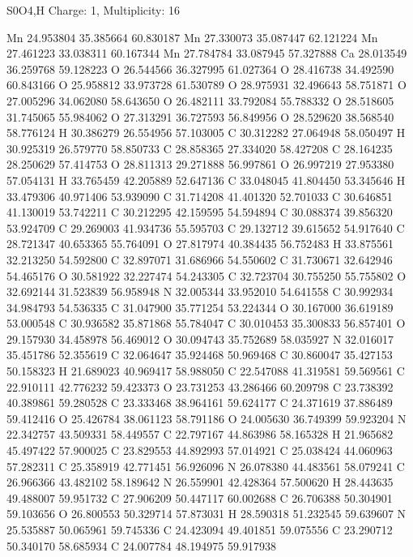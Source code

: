 \documentclass{article}
\begin{document}
S0O4,H   Charge: 1, Multiplicity: 16      
    
Mn 24.953804 35.385664 60.830187 
Mn 27.330073 35.087447 62.121224 
Mn 27.461223 33.038311 60.167344 
Mn 27.784784 33.087945 57.327888 
Ca 28.013549 36.259768 59.128223 
O 26.544566 36.327995 61.027364 
O 28.416738 34.492590 60.843166 
O 25.958812 33.973728 61.530789 
O 28.975931 32.496643 58.751871 
O 27.005296 34.062080 58.643650 
O 26.482111 33.792084 55.788332 
O 28.518605 31.745065 55.984062 
O 27.313291 36.727593 56.849956 
O 28.529620 38.568540 58.776124 
H 30.386279 26.554956 57.103005 
C 30.312282 27.064948 58.050497 
H 30.925319 26.579770 58.850733 
C 28.858365 27.334020 58.427208 
C 28.164235 28.250629 57.414753 
O 28.811313 29.271888 56.997861 
O 26.997219 27.953380 57.054131 
H 33.765459 42.205889 52.647136 
C 33.048045 41.804450 53.345646 
H 33.479306 40.971406 53.939090 
C 31.714208 41.401320 52.701033 
C 30.646851 41.130019 53.742211 
C 30.212295 42.159595 54.594894 
C 30.088374 39.856320 53.924709 
C 29.269003 41.934736 55.595703 
C 29.132712 39.615652 54.917640 
C 28.721347 40.653365 55.764091 
O 27.817974 40.384435 56.752483 
H 33.875561 32.213250 54.592800 
C 32.897071 31.686966 54.550602 
C 31.730671 32.642946 54.465176 
O 30.581922 32.227474 54.243305 
C 32.723704 30.755250 55.755802 
O 32.692144 31.523839 56.958948 
N 32.005344 33.952010 54.641558 
C 30.992934 34.984793 54.536335 
C 31.047900 35.771254 53.224344 
O 30.167000 36.619189 53.000548 
C 30.936582 35.871868 55.784047 
C 30.010453 35.300833 56.857401 
O 29.157930 34.458978 56.469012 
O 30.094743 35.752689 58.035927 
N 32.016017 35.451786 52.355619 
C 32.064647 35.924468 50.969468 
C 30.860047 35.427153 50.158323 
H 21.689023 40.969417 58.988050 
C 22.547088 41.319581 59.569561 
C 22.910111 42.776232 59.423373 
O 23.731253 43.286466 60.209798 
C 23.738392 40.389861 59.280528 
C 23.333468 38.964161 59.624177 
C 24.371619 37.886489 59.412416 
O 25.426784 38.061123 58.791186 
O 24.005630 36.749399 59.923204 
N 22.342757 43.509331 58.449557 
C 22.797167 44.863986 58.165328 
H 21.965682 45.497422 57.900025 
C 23.829553 44.892993 57.014921 
C 25.038424 44.060963 57.282311 
C 25.358919 42.771451 56.926096 
N 26.078380 44.483561 58.079241 
C 26.966366 43.482102 58.189642 
N 26.559901 42.428364 57.500620 
H 28.443635 49.488007 59.951732 
C 27.906209 50.447117 60.002688 
C 26.706388 50.304901 59.103656 
O 26.800553 50.329714 57.873031 
H 28.590318 51.232545 59.639607 
N 25.535887 50.065961 59.745336 
C 24.423094 49.401851 59.075556 
C 23.290712 50.340170 58.685934 
C 24.007784 48.194975 59.917938 
\end{document}
